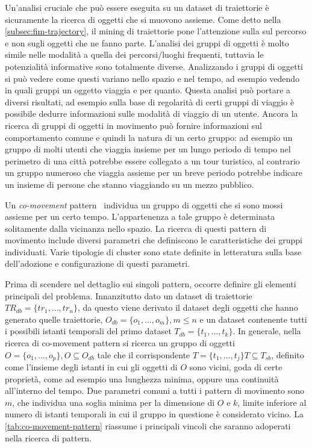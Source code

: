 Un'analisi cruciale che può essere eseguita su un dataset di traiettorie è sicuramente la ricerca di oggetti che si muovono assieme.
Come detto nella \cref{subsec:fim-trajectory}, il mining di traiettorie pone l'attenzione sulla sul percorso e non sugli oggetti che ne fanno parte.
L'analisi dei gruppi di oggetti è molto simile nelle modalità a quella dei percorsi/luoghi frequenti, tuttavia le potenzialità informative sono totalmente diverse.
Analizzando i gruppi di oggetti si può vedere come questi variano nello spazio e nel tempo, ad esempio vedendo in quali gruppi un oggetto viaggia e per quanto.
Questa analisi può portare a diversi risultati, ad esempio sulla base di regolarità di certi gruppi di viaggio è possibile dedurre informazioni sulle modalità di viaggio di un utente.
Ancora la ricerca di gruppi di oggetti in movimento può fornire informazioni sul comportamento comune e quindi la natura di un certo gruppo: ad esempio un gruppo di molti utenti che viaggia insieme per un lungo periodo di tempo nel perimetro di una città potrebbe essere collegato a un tour turistico, al contrario un gruppo numeroso che viaggia assieme per un breve periodo potrebbe indicare un insieme di persone che stanno viaggiando su un mezzo pubblico.

Un \textit{co-movement} pattern~\cite{zheng2015trajectory} individua un gruppo di oggetti che si sono mossi assieme
per un certo tempo.
L'appartenenza a tale gruppo è determinata solitamente dalla vicinanza nello spazio.
La ricerca di questi pattern di movimento include diversi parametri che definiscono le caratteristiche dei gruppi individuati.
Varie tipologie di cluster sono state definite in letteratura sulla base dell'adozione e configurazione di questi parametri.

Prima di scendere nel dettaglio sui singoli pattern, occorre definire gli elementi principali del problema.
Innanzitutto dato un dataset di traiettorie \(TR_{db} = \{tr_{1}, \ldots, tr_{n}\} \), da questo viene derivato il dataset
degli oggetti che hanno generato quelle traiettorie, \(O_{db} = \{ o_{1}, \ldots, o_{m} \}, m \leq n\)
e un dataset contenente tutti i possibili istanti temporali del primo dataset
\(T_{db} = \{t_{1}, \ldots, t_{k}\} \).
In generale, nella ricerca di co-movement pattern si ricerca un gruppo di oggetti \(O = \{ o_{1}, \ldots, o_{p} \}, O \subseteq O_{db} \)
tale che il corrispondente \(T = \{t_{1}, \ldots, t_{j}\} T \subseteq T_{sb}\), definito come l'insieme degli istanti in cui gli oggetti di \(O\) sono vicini, goda di certe proprietà, come
ad esempio una lunghezza minima, oppure una continuità all'interno del tempo.
Due parametri comuni a tutti i pattern di movimento sono \(m\), che individua una
soglia minima per la dimensione di \(O\) e \(k\), limite inferiore al numero
di istanti temporali in cui il gruppo in questione è considerato vicino.
La \cref{tab:co-movement-pattern} riassume i principali vincoli che saranno adoperati nella ricerca di pattern.

